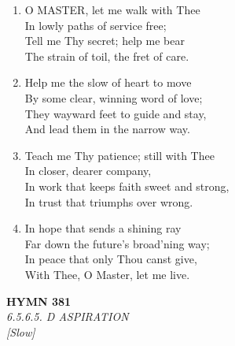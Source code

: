 \begin{enumerate}
    \item O MASTER, let me walk with Thee \\
        In lowly paths of service free; \\
        Tell me Thy secret; help me bear \\
        The strain of toil, the fret of care.

    \item Help me the slow of heart to move \\
        By some clear, winning word of love; \\
        They wayward feet to guide and stay, \\
        And lead them in the narrow way.

    \item Teach me Thy patience; still with Thee \\
        In closer, dearer company, \\
        In work that keeps faith sweet and strong, \\
        In trust that triumphs over wrong.

    \item In hope that sends a shining ray \\
        Far down the future's broad'ning way; \\
        In peace that only Thou canst give, \\
        With Thee, O Master, let me live.

\end{enumerate}

\newpage
\begin{center}
    {\Large \textbf{HYMN 381}}
    \\
    \textit{6.5.6.5. D ASPIRATION}
    \\
    \textit{\small [Slow]}
\end{center}
\vspace{1em}

